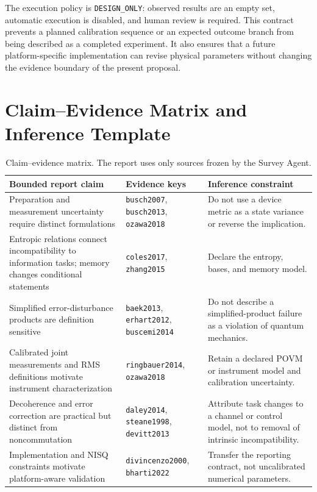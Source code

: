 \documentclass[conference]{../../../../Conference-LaTeX-template_10-17-19/IEEEtran}
\begin{document}
The execution policy is \texttt{DESIGN\_ONLY}: observed results are an empty set, automatic execution is disabled, and human review is required. This contract prevents a planned calibration sequence or an expected outcome branch from being described as a completed experiment. It also ensures that a future platform-specific implementation can revise physical parameters without changing the evidence boundary of the present proposal.

\section{Claim--Evidence Matrix and Inference Template}

\begin{table}[!t]
\caption{Claim--evidence matrix. The report uses only sources frozen by the Survey Agent.}
\label{tab:evidence}
\centering
\footnotesize
\begin{tabularx}{\textwidth}{p{}p{}Y}
\toprule
\textbf{Bounded report claim} & \textbf{Evidence keys} & \textbf{Inference constraint}\\
\midrule
Preparation and measurement uncertainty require distinct formulations & \texttt{busch2007}, \texttt{busch2013}, \texttt{ozawa2018} & Do not use a device metric as a state variance or reverse the implication. \\
Entropic relations connect incompatibility to information tasks; memory changes conditional statements & \texttt{coles2017}, \texttt{zhang2015} & Declare the entropy, bases, and memory model. \\
Simplified error-disturbance products are definition sensitive & \texttt{baek2013}, \texttt{erhart2012}, \texttt{buscemi2014} & Do not describe a simplified-product failure as a violation of quantum mechanics. \\
Calibrated joint measurements and RMS definitions motivate instrument characterization & \texttt{ringbauer2014}, \texttt{ozawa2018} & Retain a declared POVM or instrument model and calibration uncertainty. \\
Decoherence and error correction are practical but distinct from noncommutation & \texttt{daley2014}, \texttt{steane1998}, \texttt{devitt2013} & Attribute task changes to a channel or control model, not to removal of intrinsic incompatibility. \\
Implementation and NISQ constraints motivate platform-aware validation & \texttt{divincenzo2000}, \texttt{bharti2022} & Transfer the reporting contract, not uncalibrated numerical parameters. \\
\bottomrule
\end{tabularx}
\end{table}
\end{document}
